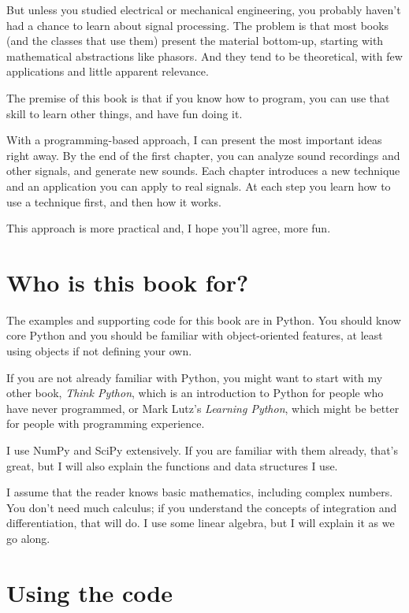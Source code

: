 \documentclass[12pt]{book}
\begin{document}
But unless you studied electrical or mechanical engineering, you
probably haven't had a chance to learn about signal processing.  The
problem is that most books (and the classes that use them) present the
material bottom-up, starting with mathematical abstractions like
phasors.  And they tend to be theoretical, with few applications and
little apparent relevance.

The premise of this book is that if you know how to program, you
can use that skill to learn other things, and have fun doing it.

With a programming-based approach, I can present the most important
ideas right away.  By the end of the first chapter, you can analyze
sound recordings and other signals, and generate new sounds.  Each
chapter introduces a new technique and an application you can
apply to real signals.  At each step you learn how to use a
technique first, and then how it works.

This approach is more practical and, I hope you'll agree, more fun.


\section{Who is this book for?}

The examples and supporting code for this book are in Python.  You
should know core Python and you should be
familiar with object-oriented features, at least using objects if not
defining your own.

If you are not already familiar with Python, you might want to start
with my other book, {\it Think Python}, which is an introduction to
Python for people who have never programmed, or Mark
Lutz's {\it Learning Python}, which might be better for people with
programming experience.

I use NumPy and SciPy extensively.  If you are familiar with them
already, that's great, but I will also explain the functions
and data structures I use.

I assume that the reader knows basic mathematics, including complex
numbers.  You don't need much calculus; if you understand the concepts
of integration and differentiation, that will do.
I use some linear algebra, but I will explain it as we
go along.


\section{Using the code}
\label{code}
\end{document}
